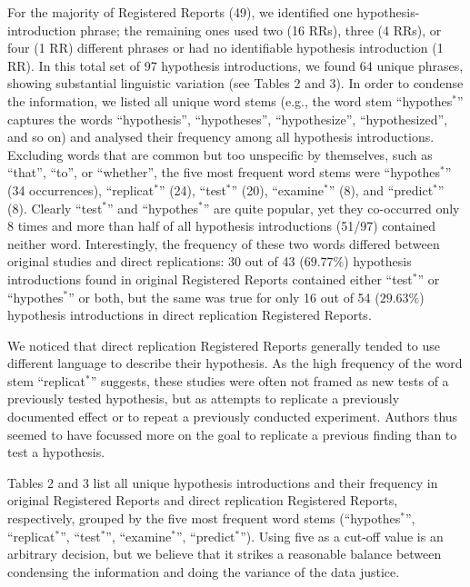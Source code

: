 \documentclass[british,,jou,floatsintext]{apa6}
\begin{document}
For the majority of Registered Reports (49), we identified one hypothesis-introduction phrase; the remaining ones used two (16 RRs), three (4 RRs), or four (1 RR) different phrases or had no identifiable hypothesis introduction (1 RR).
In this total set of 97 hypothesis introductions, we found 64 unique phrases, showing substantial linguistic variation (see Tables 2 and 3).
In order to condense the information, we listed all unique word stems (e.g., the word stem \enquote{hypothes\(^\ast\)} captures the words \enquote{hypothesis}, \enquote{hypotheses}, \enquote{hypothesize}, \enquote{hypothesized}, and so on) and analysed their frequency among all hypothesis introductions.
Excluding words that are common but too unspecific by themselves, such as \enquote{that}, \enquote{to}, or \enquote{whether}, the five most frequent word stems were \enquote{hypothes\(^\ast\)} (34 occurrences), \enquote{replicat\(^\ast\)} (24), \enquote{test\(^\ast\)} (20), \enquote{examine\(^\ast\)} (8), and \enquote{predict\(^\ast\)} (8).
Clearly \enquote{test\(^\ast\)} and \enquote{hypothes\(^\ast\)} are quite popular, yet they co-occurred only 8 times and more than half of all hypothesis introductions (51/97) contained neither word. Interestingly, the frequency of these two words differed between original studies and direct replications: 30 out of 43 (\(69.77\%\)) hypothesis introductions found in original Registered Reports contained either \enquote{test\(^\ast\)} or \enquote{hypothes\(^\ast\)} or both, but the same was true for only 16 out of 54 (\(29.63\%\)) hypothesis introductions in direct replication Registered Reports.

We noticed that direct replication Registered Reports generally tended to use different language to describe their hypothesis. As the high frequency of the word stem \enquote{replicat\(^\ast\)} suggests, these studies were often not framed as new tests of a previously tested hypothesis, but as attempts to replicate a previously documented effect or to repeat a previously conducted experiment.
Authors thus seemed to have focussed more on the goal to replicate a previous finding than to test a hypothesis.

Tables 2 and 3 list all unique hypothesis introductions and their frequency in original Registered Reports and direct replication Registered Reports, respectively, grouped by the five most frequent word stems (\enquote{hypothes\(^\ast\)}, \enquote{replicat\(^\ast\)}, \enquote{test\(^\ast\)}, \enquote{examine\(^\ast\)}, \enquote{predict\(^\ast\)}).
Using five as a cut-off value is an arbitrary decision, but we believe that it strikes a reasonable balance between condensing the information and doing the variance of the data justice.
\end{document}
